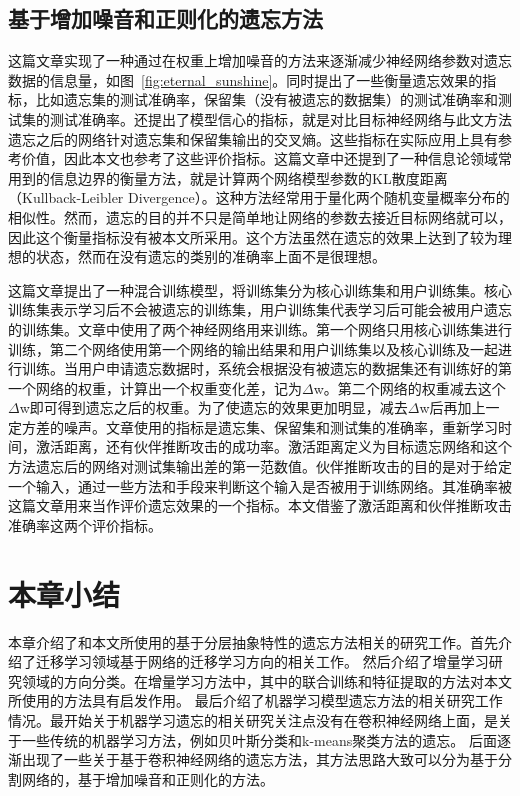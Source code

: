 \subsection{基于增加噪音和正则化的遗忘方法}
这篇文章\cite{Golatkar_2020_CVPR}实现了一种通过在权重上增加噪音的方法来逐渐减少神经网络参数对遗忘数据的信息量，如图~\ref{fig:eternal_sunshine}。同时提出了一些衡量遗忘效果的指标，比如遗忘集的测试准确率，保留集（没有被遗忘的数据集）的测试准确率和测试集的测试准确率。还提出了模型信心的指标，就是对比目标神经网络与此文方法遗忘之后的网络针对遗忘集和保留集输出的交叉熵。这些指标在实际应用上具有参考价值，因此本文也参考了这些评价指标。这篇文章中还提到了一种信息论领域常用到的信息边界的衡量方法，就是计算两个网络模型参数的KL散度距离（Kullback-Leibler Divergence）。这种方法经常用于量化两个随机变量概率分布的相似性。然而，遗忘的目的并不只是简单地让网络的参数去接近目标网络就可以，因此这个衡量指标没有被本文所采用。这个方法虽然在遗忘的效果上达到了较为理想的状态，然而在没有遗忘的类别的准确率上面不是很理想。

这篇文章\cite{Golatkar_2021_CVPR}提出了一种混合训练模型，将训练集分为核心训练集和用户训练集。核心训练集表示学习后不会被遗忘的训练集，用户训练集代表学习后可能会被用户遗忘的训练集。文章中使用了两个神经网络用来训练。第一个网络只用核心训练集进行训练，第二个网络使用第一个网络的输出结果和用户训练集以及核心训练及一起进行训练。当用户申请遗忘数据时，系统会根据没有被遗忘的数据集还有训练好的第一个网络的权重，计算出一个权重变化差，记为$\Delta$w。第二个网络的权重减去这个$\Delta$w即可得到遗忘之后的权重。为了使遗忘的效果更加明显，减去$\Delta$w后再加上一定方差的噪声。文章使用的指标是遗忘集、保留集和测试集的准确率，重新学习时间，激活距离，还有伙伴推断攻击的成功率。激活距离定义为目标遗忘网络和这个方法遗忘后的网络对测试集输出差的第一范数值。伙伴推断攻击的目的是对于给定一个输入，通过一些方法和手段来判断这个输入是否被用于训练网络。其准确率被这篇文章用来当作评价遗忘效果的一个指标。本文借鉴了激活距离和伙伴推断攻击准确率这两个评价指标。


\section{本章小结}
本章介绍了和本文所使用的基于分层抽象特性的遗忘方法相关的研究工作。首先介绍了迁移学习领域基于网络的迁移学习方向的相关工作。
然后介绍了增量学习研究领域的方向分类。在增量学习方法中，其中的联合训练和特征提取的方法对本文所使用的方法具有启发作用。
最后介绍了机器学习模型遗忘方法的相关研究工作情况。最开始关于机器学习遗忘的相关研究关注点没有在卷积神经网络上面，是关于一些传统的机器学习方法，例如贝叶斯分类和k-means聚类方法的遗忘。
后面逐渐出现了一些关于基于卷积神经网络的遗忘方法，其方法思路大致可以分为基于分割网络的，基于增加噪音和正则化的方法。
